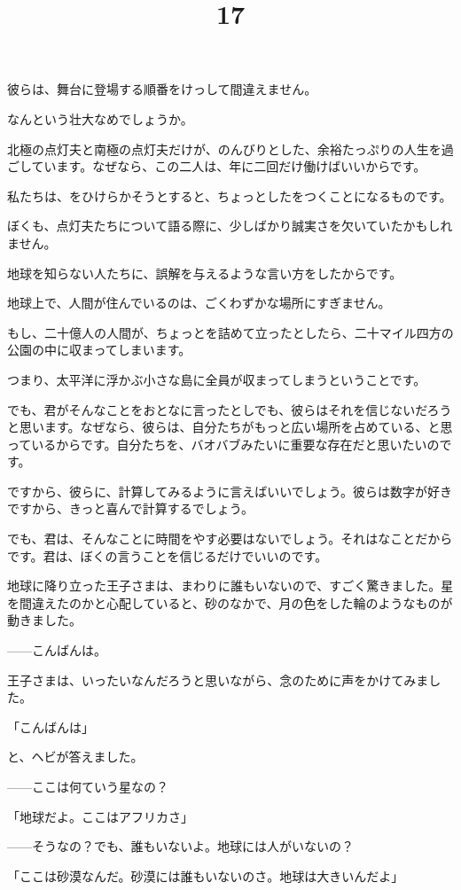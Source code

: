 彼らは、舞台に登場する順番をけっして間違えません。

なんという壮大なめでしょうか。

北極の点灯夫と南極の点灯夫だけが、のんびりとした、余裕たっぷりの人生を過ごしています。なぜなら、この二人は、年に二回だけ働けばいいからです。

\title{17}


私たちは、をひけらかそうとすると、ちょっとしたをつくことになるものです。

ぼくも、点灯夫たちについて語る際に、少しばかり誠実さを欠いていたかもしれません。

地球を知らない人たちに、誤解を与えるような言い方をしたからです。

地球上で、人間が住んでいるのは、ごくわずかな場所にすぎません。

もし、二十億人の人間が、ちょっとを詰めて立ったとしたら、二十マイル四方の公園の中に収まってしまいます。

つまり、太平洋に浮かぶ小さな島に全員が収まってしまうということです。

でも、君がそんなことをおとなに言ったとしでも、彼らはそれを信じないだろうと思います。なぜなら、彼らは、自分たちがもっと広い場所を占めている、と思っているからです。自分たちを、バオバブみたいに重要な存在だと思いたいのです。

ですから、彼らに、計算してみるように言えばいいでしょう。彼らは数字が好きですから、きっと喜んで計算するでしょう。

でも、君は、そんなことに時間をやす必要はないでしょう。それはなことだからです。君は、ぼくの言うことを信じるだけでいいのです。

地球に降り立った王子さまは、まわりに誰もいないので、すごく驚きました。星を間違えたのかと心配していると、砂のなかで、月の色をした輪のようなものが動きました。

——こんばんは。

王子さまは、いったいなんだろうと思いながら、念のために声をかけてみました。

「こんばんは」

と、ヘビが答えました。

——ここは何ていう星なの？

「地球だよ。ここはアフリカさ」

——そうなの？でも、誰もいないよ。地球には人がいないの？

「ここは砂漠なんだ。砂漠には誰もいないのさ。地球は大きいんだよ」

